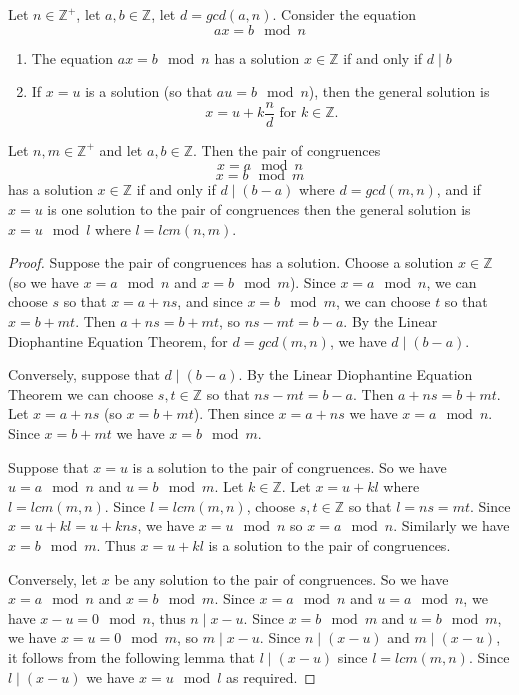 
\begin{thm}
Let $n\in\mathbb{Z}^+$, let $a,b\in\mathbb{Z}$, let $d = gcd(a,n)$. Consider the equation \[ax =b \mod n\]
\begin{enumerate}
\item The equation $ax = b\mod n$ has a solution $x\in\mathbb{Z}$ if and only if $d\mid b$
\item If $x = u$ is a solution (so that $au =b \mod n$), then the general solution is \[x = u + k\frac{n}{d} \text{ for } k\in\mathbb{Z}.\]
\end{enumerate}
\end{thm}

\begin{thm}
Let $n,m\in\mathbb{Z}^+$ and let $a,b\in\mathbb{Z}$. Then the pair of congruences \[x = a \mod n\] \[x = b\mod m\] has a solution $x\in\mathbb{Z}$ if and only if $d\mid (b-a)$ where $d = gcd(m,n)$, and if $x=u$ is one solution to the pair of congruences then the general solution is $x=u\mod l$ where $l = lcm(n,m)$.
\end{thm}

\begin{proof}
Suppose the pair of congruences has a solution. Choose a solution $x\in\mathbb{Z}$ (so we have $x=a\mod n$ and $x=b\mod m$). Since $x=a\mod n$, we can choose $s$ so that $x = a + ns$, and since $x = b\mod m$, we can choose $t$ so that $x= b + mt$. Then $a+ns = b+mt$, so $ns-mt = b-a$. By the Linear Diophantine Equation Theorem, for $d = gcd(m,n)$, we have $d\mid (b-a)$.

Conversely, suppose that $d\mid (b-a)$. By the Linear Diophantine Equation Theorem we can choose $s,t\in\mathbb{Z}$ so that $ns-mt = b-a$. Then $a+ns = b+mt$. Let $x = a+ns$ (so $x=b+mt$). Then since $x = a+ns$ we have $x=a \mod n$. Since $x = b +mt$ we have $x = b\mod m$.

Suppose that $x=u$ is a solution to the pair of congruences. So we have $u = a \mod n$ and $u = b\mod m$. Let $k\in\mathbb{Z}$. Let $x = u + kl$ where $l = lcm(m,n)$. Since $l = lcm(m,n)$, choose $s,t\in\mathbb{Z}$ so that $l = ns = mt$. Since $x = u + kl = u + kns$, we have $x = u \mod n$ so $x = a\mod n$. Similarly we have $x= b\mod m$. Thus $x = u + kl$ is a solution to the pair of congruences.

Conversely, let $x$ be any solution to the pair of congruences. So we have $x= a \mod n$ and $x = b \mod m$. Since $x = a\mod n$ and $u = a\mod n$, we have $x-u = 0 \mod n$, thus $n\mid x-u$. Since $x = b\mod m$ and $u = b\mod m$, we have $x=u = 0\mod m$, so $m\mid x-u$. Since $n\mid (x-u)$ and $m\mid (x-u)$, it follows from the following lemma that $l \mid (x-u)$ since $l = lcm(m,n)$. Since $l\mid (x-u)$ we have $x = u\mod l$ as required.
\end{proof}

